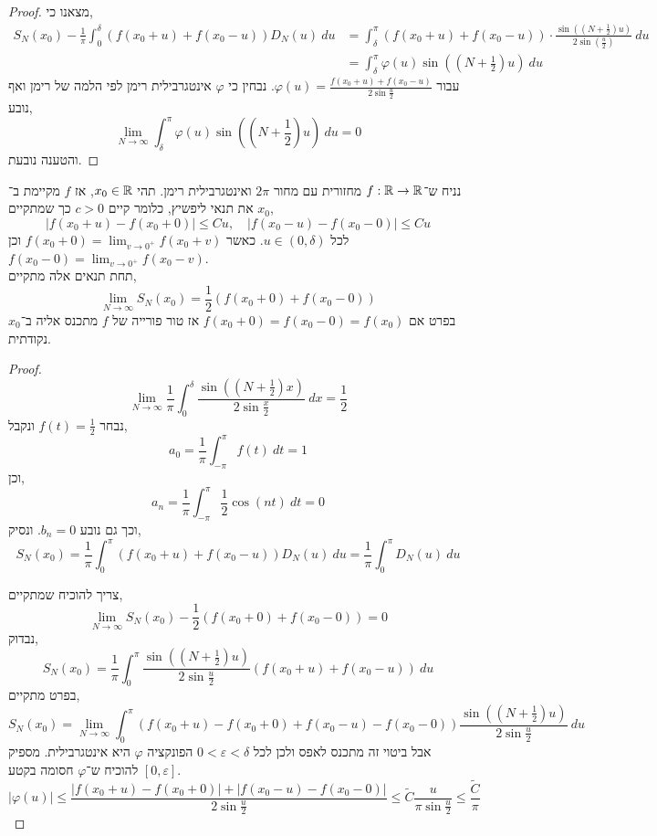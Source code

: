 \begin{proof}
	מצאנו כי,
	\begin{align*}
		S_N(x_0) - \frac{1}{\pi} \int_{0}^{\delta} (f(x_0 + u) + f(x_0 - u)) D_N(u)\ du
		& = \int_{\delta}^{\pi} (f(x_0 + u) + f(x_0 - u)) \cdot \frac{\sin((N + \frac{1}{2}) u)}{2 \sin(\frac{u}{2})}\ du \\
		& = \int_{\delta}^{\pi} \varphi(u) \sin((N + \frac{1}{2}) u)\ du
	\end{align*}
	עבור $\varphi(u) = \frac{f(x_0 + u) + f(x_0 - u)}{2 \sin \frac{u}{2}}$.
	נבחין כי $\varphi$ אינטגרבילית רימן לפי הלמה של רימן ואף נובע,
	\[
		\lim_{N \to \infty} \int_{\delta}^{\pi} \varphi(u) \sin((N + \frac{1}{2}) u)\ du
		= 0
	\]
	והטענה נובעת.
\end{proof}
\begin{theorem}
	נניח ש־$f : \mathbb{R} \to \mathbb{R}$ מחזורית עם מחור $2 \pi$ ואינטגרבילית רימן.
	תהי $x_0 \in \mathbb{R}$, אז $f$ מקיימת ב־$x_0$ את תנאי ליפשיץ,
	כלומר קיים $c > 0$ כך שמתקיים,
	\[
		|f(x_0 + u) - f(x_0 + 0)| \le C u,
		\quad
		|f(x_0 - u) - f(x_0 - 0)| \le C u
	\]
	לכל $u \in (0, \delta)$.
	כאשר $f(x_0 + 0) = \lim_{v \to 0^+} f(x_0 + v)$ וכן $f(x_0 - 0) = \lim_{v \to 0^+} f(x_0 - v)$. \\
	תחת תנאים אלה מתקיים,
	\[
		\lim_{N \to \infty} S_N(x_0)
		= \frac{1}{2}(f(x_0 + 0) + f(x_0 - 0))
	\]
	בפרט אם $f(x_0 + 0) = f(x_0 - 0) = f(x_0)$ אז טור פורייה של $f$ מתכנס אליה ב־$x_0$ נקודתית.
\end{theorem}
\begin{proof}
	\[
		\lim_{N \to \infty} \frac{1}{\pi} \int_{0}^{\delta} \frac{\sin((N + \frac{1}{2}) x)}{2 \sin \frac{x}{2}}\ dx
		= \frac{1}{2}
	\]
	נבחר $f(t) = \frac{1}{2}$ ונקבל,
	\[
		a_0
		= \frac{1}{\pi} \int_{-\pi}^{\pi} f(t)\ dt
		= 1
	\]
	וכן,
	\[
		a_n
		= \frac{1}{\pi} \int_{-\pi}^{\pi} \frac{1}{2} \cos(nt)\ dt
		= 0
	\]
	וכך גם נובע $b_n = 0$.
	ונסיק,
	\[
		S_N(x_0)
		= \frac{1}{\pi} \int_{0}^{\pi} (f(x_0 + u) + f(x_0 - u)) D_N(u)\ du
		= \frac{1}{\pi} \int_{0}^{\pi} D_N(u)\ du
	\]

	צריך להוכיח שמתקיים,
	\[
		\lim_{N \to \infty} S_N(x_0) - \frac{1}{2}(f(x_0 + 0) + f(x_0 - 0))
		= 0
	\]
	נבדוק,
	\[
		S_N(x_0)
		= \frac{1}{\pi} \int_{0}^{\pi} \frac{\sin((N + \frac{1}{2}) u)}{2 \sin \frac{u}{2}} (f(x_0 + u) + f(x_0 - u))\ du
	\]
	בפרט מתקיים,
	\[
		S_N(x_0)
		= \lim_{N \to \infty} \int_{0}^{\pi} (f(x_0 + u) - f(x_0 + 0) + f(x_0 - u) - f(x_0 - 0)) \frac{\sin((N + \frac{1}{2}) u)}{2 \sin \frac{u}{2}}\ du
	\]
	אבל ביטוי זה מתכנס לאפס ולכן לכל $0 < \varepsilon < \delta$ הפונקציה $\varphi$ היא אינטגרבילית.
	מספיק להוכיח ש־$\varphi$ חסומה בקטע $[0, \varepsilon]$.
	\[
		|\varphi(u)|
		\le \frac{|f(x_0 + u) - f(x_0 + 0)| + |f(x_0 - u) - f(x_0 - 0)|}{2 \sin \frac{u}{2}}
		\le \tilde{C} \frac{u}{\pi \sin \frac{u}{2}}
		\le \frac{\tilde{C}}{\pi}
	\]
\end{proof}

